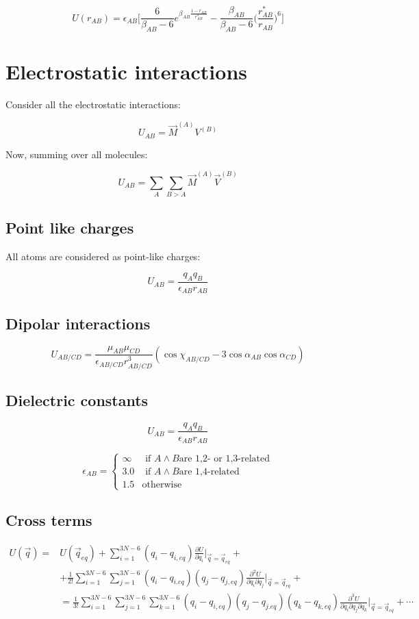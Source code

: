 	$$U(r_{AB}) = \epsilon_{AB}\biggl[\frac{6}{\beta_{AB}-6}e^{\beta_{AB}\frac{1-r_{AB}}{r^*_{AB}}}-\frac{\beta_{AB}}{\beta_{AB}-6}\biggl(\frac{r^*_{AB}}{r_{AB}}\biggr)^6\biggr]$$


\section{Electrostatic interactions}
Consider all the electrostatic interactions:

$$U_{AB} = \vec{M}^{(A)}V^{(B)}$$

Now, summing over all molecules:

$$U_{AB} = \sum\limits_{A}\sum\limits_{B>A}\vec{M}^{(A)}\vec{V}^{(B)}$$

	\subsection{Point like charges}
	All atoms are considered as point-like charges:

	$$U_{AB} = \frac{q_Aq_B}{\epsilon_{AB}r_{AB}}$$

	\subsection{Dipolar interactions}

	$$U_{AB/CD} = \frac{\mu_{AB}\mu_{CD}}{\epsilon_{AB/CD}r^3_{AB/CD}}(\cos\chi_{AB/CD}-3\cos\alpha_{AB}\cos\alpha_{CD})$$

	\subsection{Dielectric constants}

	$$U_{AB} = \frac{q_Aq_B}{\epsilon_{AB}r_{AB}}$$

	$$\epsilon_{AB} = \begin{cases}\infty&\text{ if }A\land B\text{are 1,2- or 1,3-related}\\3.0&\text{ if }A\land B\text{are 1,4-related}\\1.5&\text{otherwise}\end{cases}$$

	\subsection{Cross terms}

	\begin{align*}
		U(\vec{q}) = &U(\vec{q}_{eq}) + \sum\limits_{i=1}^{3N-6}(q_i-q_{i,eq})\frac{\partial U}{\partial q_i}|_{\vec{q}=\vec{q}_{eq}} + \\
								 &+\frac{1}{2!}\sum\limits_{i=1}^{3N-6}\sum\limits_{j=1}^{3N-6}(q_i-q_{i.eq})(q_j-q_{j,eq})\frac{\partial^2 U}{\partial q_i\partial q_j}|_{\vec{q}=\vec{q}_{eq}} +\\
								 &=\frac{1}{3!}\sum\limits_{i=1}^{3N-6}\sum\limits_{j=1}^{3N-6}\sum\limits_{k=1}^{3N-6}(q_i-q_{i,eq})(q_j-q_{j.eq})(q_k-q_{k,eq})\frac{\partial^3 U}{\partial q_i\partial q_j\partial q_k}|_{\vec{q}=\vec{q}_{eq}} + \cdots
	\end{align*}

